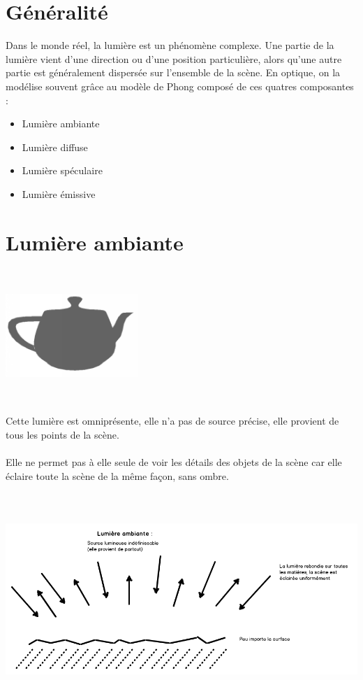 \section{Généralité}
Dans le monde réel, la lumière est un phénomène complexe.
Une partie de la lumière vient d’une direction ou d’une position particulière, alors
qu’une autre partie est généralement dispersée sur l’ensemble de la scène. En optique, on la modélise souvent grâce au modèle de Phong composé de ces quatres composantes :
\begin{itemize}
\item Lumière ambiante
\item Lumière diffuse
\item Lumière spéculaire
\item Lumière émissive
\end{itemize}

\section{Lumière ambiante}
\begin{center}
\includegraphics[width=5cm,height=5cm]{pipeline/images/objet_ambiante.png}
\end{center}

Cette lumière est omniprésente, elle n'a pas de source précise, elle provient de tous les points de la scène.
\\\\
Elle ne permet pas à elle seule de voir les détails des objets de la scène car elle éclaire toute la scène de la même façon, sans ombre.
\\\\
\begin{center}
\includegraphics[width=17cm,height=7cm]{pipeline/images/lumiere_ambiante.png}
\end{center}


